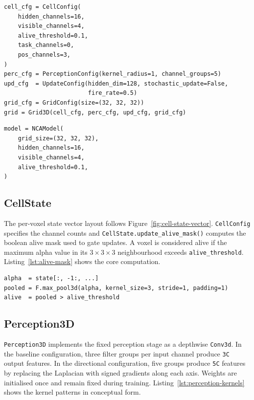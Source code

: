 \begin{lstlisting}[style=py, caption={Low-level \texttt{Grid3D} construction
from individual component configs, used when custom behaviour or modified
components are needed.}, label={lst:model-lowlevel}]
cell_cfg = CellConfig(
    hidden_channels=16,
    visible_channels=4,
    alive_threshold=0.1,
    task_channels=0,
    pos_channels=3,
)
perc_cfg = PerceptionConfig(kernel_radius=1, channel_groups=5)
upd_cfg  = UpdateConfig(hidden_dim=128, stochastic_update=False,
                        fire_rate=0.5)
grid_cfg = GridConfig(size=(32, 32, 32))
grid = Grid3D(cell_cfg, perc_cfg, upd_cfg, grid_cfg)
\end{lstlisting}

\begin{lstlisting}[style=py, caption={High-level \texttt{NCAModel} wrapper
for standard initialisation via keyword arguments.},
label={lst:model-highlevel}]
model = NCAModel(
    grid_size=(32, 32, 32),
    hidden_channels=16,
    visible_channels=4,
    alive_threshold=0.1,
)
\end{lstlisting}

\subsection{CellState}

The per-voxel state vector layout follows Figure~\ref{fig:cell-state-vector}.
\texttt{CellConfig} specifies the channel counts and
\texttt{CellState.update\_alive\_mask()} computes the boolean alive mask used
to gate updates. A voxel is considered alive if the maximum alpha value in its
$3{\times}3{\times}3$ neighbourhood exceeds \texttt{alive\_threshold}.
Listing~\ref{lst:alive-mask} shows the core computation.

\begin{lstlisting}[style=py, caption={Alive-mask computation from the alpha
channel.}, label={lst:alive-mask}]
alpha  = state[:, -1:, ...]
pooled = F.max_pool3d(alpha, kernel_size=3, stride=1, padding=1)
alive  = pooled > alive_threshold
\end{lstlisting}

\subsection{Perception3D}

\texttt{Perception3D} implements the fixed perception stage as a depthwise
\texttt{Conv3d}. In the baseline configuration, three filter groups per input
channel produce \texttt{3C} output features. In the directional configuration,
five groups produce \texttt{5C} features by replacing the Laplacian with signed
gradients along each axis. Weights are initialised once and remain fixed during
training. Listing~\ref{lst:perception-kernels} shows the kernel patterns in
conceptual form.

